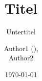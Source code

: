 \title{Titel} %
\subtitle{Untertitel} %
\author{Author1 (), \\ Author2}
\newcommand{\footauthor}{Author1, Author2}
\date{\today{}}
\newcommand{\abgabetermin}{07.06.2024}
\newcommand{\labdate}{24.05.2024}
\newcommand{\betreuer}{Prof. Nummer Eins}